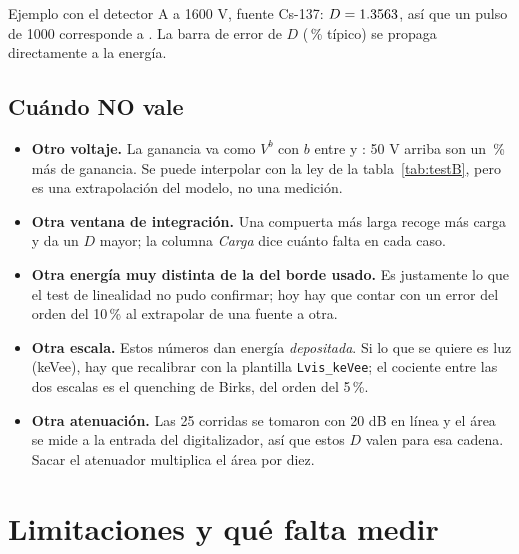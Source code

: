 \documentclass[11pt,a4paper]{article}
\begin{document}
Ejemplo con el detector A a 1600 V, fuente Cs-137: $D = 1.3563$, así que un
pulso de 1000 \mVns{} corresponde a \EjemploKeV{} \keVdep. La barra de error de
$D$ (\ErrRelMediano\,\% típico) se propaga directamente a la energía.

\subsection{Cuándo NO vale}

\begin{itemize}
\item \textbf{Otro voltaje.} La ganancia va como $V^{b}$ con $b$ entre \BMin{}
      y \BMax: 50 V arriba son un \SubidaCincuenta\,\% más de ganancia. Se
      puede interpolar con la ley de la tabla~\ref{tab:testB}, pero es una
      extrapolación del modelo, no una medición.
\item \textbf{Otra ventana de integración.} Una compuerta más larga recoge más
      carga y da un $D$ mayor; la columna \emph{Carga} dice cuánto falta en
      cada caso.
\item \textbf{Otra energía muy distinta de la del borde usado.} Es justamente
      lo que el test de linealidad no pudo confirmar; hoy hay que contar con un
      error del orden del 10\,\% al extrapolar de una fuente a otra.
\item \textbf{Otra escala.} Estos números dan energía \emph{depositada}. Si lo
      que se quiere es luz (keVee), hay que recalibrar con la plantilla
      \texttt{Lvis\_keVee}; el cociente entre las dos escalas es el quenching
      de Birks, del orden del 5\,\%.
\item \textbf{Otra atenuación.} Las 25 corridas se tomaron con 20 dB en línea y
      el área se mide a la entrada del digitalizador, así que estos $D$ valen
      para esa cadena. Sacar el atenuador multiplica el área por diez.
\end{itemize}

\section{Limitaciones y qué falta medir}
\label{sec:limites}
\end{document}
